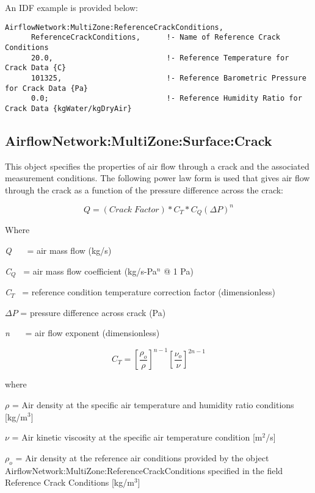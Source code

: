 An IDF example is provided below:

\begin{lstlisting}
AirflowNetwork:MultiZone:ReferenceCrackConditions,
      ReferenceCrackConditions,      !- Name of Reference Crack Conditions
      20.0,                          !- Reference Temperature for Crack Data {C}
      101325,                        !- Reference Barometric Pressure for Crack Data {Pa}
      0.0;                           !- Reference Humidity Ratio for Crack Data {kgWater/kgDryAir}
\end{lstlisting}

\subsection{AirflowNetwork:MultiZone:Surface:Crack}\label{airflownetworkmultizonesurfacecrack}

This object specifies the properties of air flow through a crack and the associated measurement conditions. The following power law form is used that gives air flow through the crack as a function of the pressure difference across the crack:

\begin{equation}
Q = \left( Crack\;Factor \right) * C_T * C_Q \left( \Delta P \right)^{n}
\end{equation}

Where

\emph{Q}~~~ = air mass flow (kg/s)

\emph{C\(_{Q}\)}~ = air mass flow coefficient (kg/s-Pa\(^{n}\) @ 1 Pa)

\emph{C\(_{T}\)}~ = reference condition temperature correction factor (dimensionless)

\(\Delta P\) = pressure difference across crack (Pa)

\emph{n}~~~ = air flow exponent (dimensionless)

\begin{equation}
{C_T} = {\left[ {\frac{{{\rho_o}}}{\rho }} \right]^{n - 1}}{\left[ {\frac{{{\nu_o}}}{\nu }} \right]^{2n - 1}}
\end{equation}

where

\(\rho\) = Air density at the specific air temperature and humidity ratio conditions {[}kg/m\(^{3}\){]}

\(\nu\) = Air kinetic viscosity at the specific air temperature condition {[}m\(^{2}\)/s{]}

\(\rho_o\) = Air density at the reference air conditions provided by the object Air\-flow\-Net\-work:\-Multi\-Zone:\-Refer\-ence\-Crack\-Con\-ditions specified in the field Reference Crack Conditions {[}kg/m\(^{3}\){]}


